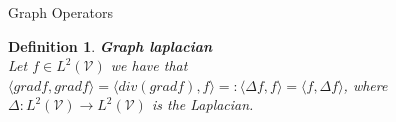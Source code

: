\documentclass{article}
\newtheorem{defn}{Definition}[section]
\newcommand{\bb}[1]{\textbf{#1}}
\newcommand{\scal}[2]{\langle #1 , #2 \rangle}
\newcommand{\mc}{\mathcal}
\begin{document}
\begin{section}{Graph Operators}
        \begin{defn}
	    \bb{Graph laplacian}\\
	    Let $f \in L^2(\mc{V})$ we have that $\scal{gradf}{gradf}=\scal{div(gradf)}{f} =: \scal{\Delta f}{f} = \scal{f}{\Delta f}$, where
	    $\Delta : L^2(\mc{V}) \to L^2(\mc{V})$ is the Laplacian.
	\end{defn}
    
    \end{section}
\end{document}
